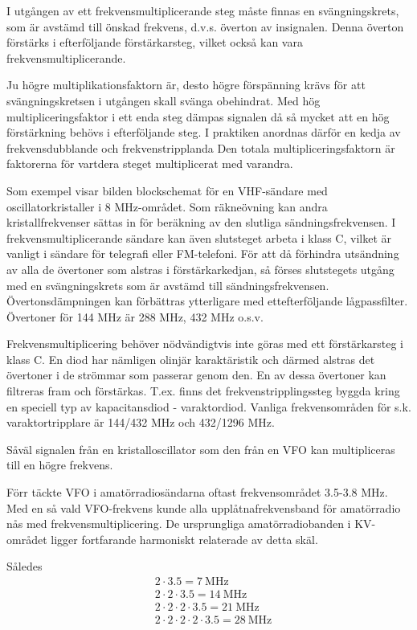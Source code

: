 I utgången av ett frekvensmultiplicerande steg måste finnas en
svängningskrets, som är avstämd till önskad frekvens, d.v.s. överton
av insignalen. Denna överton förstärks i efterföljande förstärkarsteg,
vilket också kan vara frekvensmultiplicerande.

Ju högre multiplikationsfaktorn är, desto högre förspänning krävs för
att svängningskretsen i utgången skall svänga obehindrat.  Med hög
multipliceringsfaktor i ett enda steg dämpas signalen då så mycket att
en hög förstärkning behövs i efterföljande steg. I praktiken anordnas
därför en kedja av frekvensdubblande och frekvenstripplanda Den totala
multipliceringsfaktorn är faktorerna för vartdera steget multiplicerat
med varandra.

Som exempel visar bilden blockschemat för en VHF-sändare med
oscillatorkristaller i 8 MHz-området. Som räkneövning kan andra
kristallfrekvenser sättas in för beräkning av den slutliga
sändningsfrekvensen. I frekvensmultiplicerande sändare kan även
slutsteget arbeta i klass C, vilket är vanligt i sändare för telegrafi
eller FM-telefoni. För att då förhindra utsändning av alla de
övertoner som alstras i förstärkarkedjan, så förses slutstegets utgång
med en svängningskrets som är avstämd till sändningsfrekvensen.
Övertonsdämpningen kan förbättras ytterligare med ettefterföljande
lågpassfilter. Övertoner för 144 MHz är 288 MHz, 432 MHz o.s.v.

Frekvensmultiplicering behöver nödvändigtvis inte göras med ett
förstärkarsteg i klass C. En diod har nämligen olinjär karaktäristik
och därmed alstras det övertoner i de strömmar som passerar genom
den. En av dessa övertoner kan filtreras fram och
förstärkas. T.ex. finns det frekvenstripplingssteg byggda kring en
speciell typ av kapacitansdiod - varaktordiod. Vanliga frekvensområden
för s.k. varaktortripplare är 144/432 MHz och 432/1296 MHz.

Såväl signalen från en kristalloscillator som den från en VFO kan
multipliceras till en högre frekvens.

Förr täckte VFO i amatörradiosändarna oftast frekvensområdet 3.5-3.8
MHz. Med en så vald VFO-frekvens kunde alla upplåtnafrekvensband för
amatörradio nås med frekvensmultiplicering. De ursprungliga
amatörradiobanden i KV-området ligger fortfarande harmoniskt
relaterade av detta skäl.

Således
\begin{align*}
  &2 \cdot 3.5 = 7\ \text{MHz} \\
  &2 \cdot 2 \cdot 3.5 = 14\ \text{MHz} \\
  &2 \cdot 2 \cdot 2 \cdot 3.5 = 21\ \text{MHz} \\
  &2 \cdot 2 \cdot 2 \cdot 2 \cdot 3.5 = 28\ \text{MHz} \\
\end{align*}

